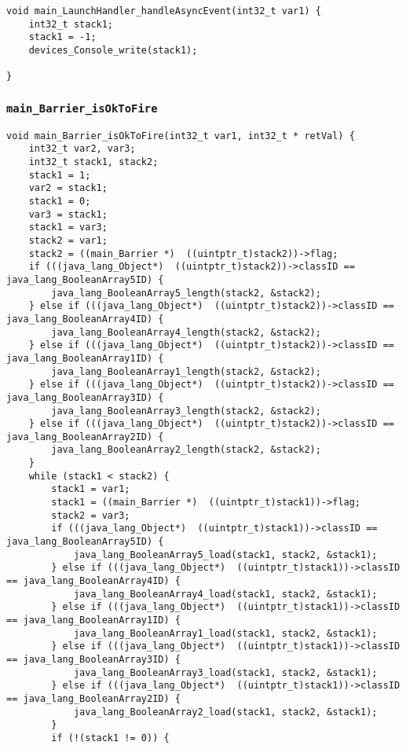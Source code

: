 \begin{landscape}
\begin{multicols}{2}
\begin{lstlisting}[firstnumber=465]
void main_LaunchHandler_handleAsyncEvent(int32_t var1) {
	int32_t stack1;
	stack1 = -1;
	devices_Console_write(stack1);

}
\end{lstlisting}

\subsubsection{\texttt{main\_Barrier\_isOkToFire}}

\begin{lstlisting}[firstnumber=472]
void main_Barrier_isOkToFire(int32_t var1, int32_t * retVal) {
	int32_t var2, var3;
	int32_t stack1, stack2;
	stack1 = 1;
	var2 = stack1;
	stack1 = 0;
	var3 = stack1;
	stack1 = var3;
	stack2 = var1;
	stack2 = ((main_Barrier *)  ((uintptr_t)stack2))->flag;
	if (((java_lang_Object*)  ((uintptr_t)stack2))->classID == java_lang_BooleanArray5ID) {
		java_lang_BooleanArray5_length(stack2, &stack2);
	} else if (((java_lang_Object*)  ((uintptr_t)stack2))->classID == java_lang_BooleanArray4ID) {
		java_lang_BooleanArray4_length(stack2, &stack2);
	} else if (((java_lang_Object*)  ((uintptr_t)stack2))->classID == java_lang_BooleanArray1ID) {
		java_lang_BooleanArray1_length(stack2, &stack2);
	} else if (((java_lang_Object*)  ((uintptr_t)stack2))->classID == java_lang_BooleanArray3ID) {
		java_lang_BooleanArray3_length(stack2, &stack2);
	} else if (((java_lang_Object*)  ((uintptr_t)stack2))->classID == java_lang_BooleanArray2ID) {
		java_lang_BooleanArray2_length(stack2, &stack2);
	}
	while (stack1 < stack2) {
		stack1 = var1;
		stack1 = ((main_Barrier *)  ((uintptr_t)stack1))->flag;
		stack2 = var3;
		if (((java_lang_Object*)  ((uintptr_t)stack1))->classID == java_lang_BooleanArray5ID) {
			java_lang_BooleanArray5_load(stack1, stack2, &stack1);
		} else if (((java_lang_Object*)  ((uintptr_t)stack1))->classID == java_lang_BooleanArray4ID) {
			java_lang_BooleanArray4_load(stack1, stack2, &stack1);
		} else if (((java_lang_Object*)  ((uintptr_t)stack1))->classID == java_lang_BooleanArray1ID) {
			java_lang_BooleanArray1_load(stack1, stack2, &stack1);
		} else if (((java_lang_Object*)  ((uintptr_t)stack1))->classID == java_lang_BooleanArray3ID) {
			java_lang_BooleanArray3_load(stack1, stack2, &stack1);
		} else if (((java_lang_Object*)  ((uintptr_t)stack1))->classID == java_lang_BooleanArray2ID) {
			java_lang_BooleanArray2_load(stack1, stack2, &stack1);
		}
		if (!(stack1 != 0)) {

\end{lstlisting}
\end{multicols}
\end{landscape}
